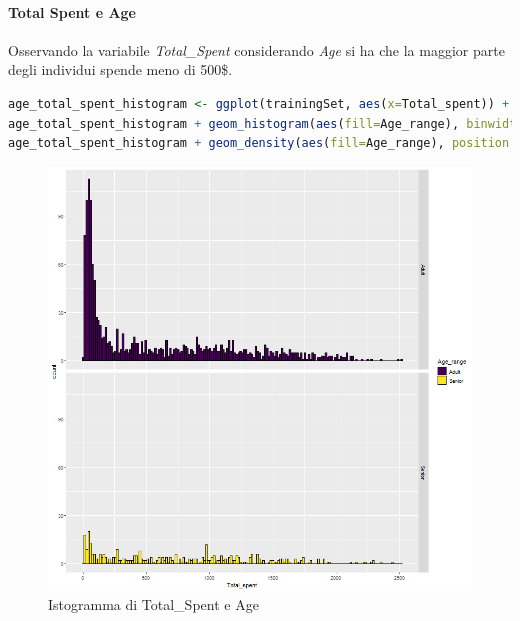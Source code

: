 \documentclass[letterpaper,11pt]{article}
\begin{document}
\paragraph{Total Spent e Age}
Osservando la variabile \textit{Total\_Spent} considerando \textit{Age} si ha che la maggior parte degli individui spende meno di 500\$.

\begin{lstlisting}[language=R]
age_total_spent_histogram <- ggplot(trainingSet, aes(x=Total_spent)) + facet_grid(Age_range~.) 
age_total_spent_histogram + geom_histogram(aes(fill=Age_range), binwidth = 15, color="Black")
age_total_spent_histogram + geom_density(aes(fill=Age_range), position = "Stack")
\end{lstlisting}


\begin{figure}[h]
  \centering
  \begin{minipage}[b]{0.4\textwidth}
    \includegraphics[width=\textwidth]{Img/EDA/EDA026.png}
    \caption{Istogramma di Total\_Spent e Age}
     \label{fig:IstogrammaTsAge}
  \end{minipage}
  \hfill
  \begin{minipage}[b]{0.4\textwidth}

\end{minipage}
\end{figure}
\end{document}
